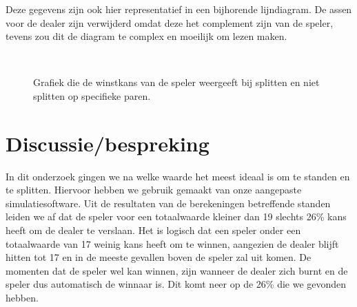 \documentclass[11pt, final, journal, a4paper]{IEEEtran}
\begin{document}
Deze gegevens zijn ook hier representatief in een bijhorende lijndiagram. De assen voor de dealer zijn verwijderd omdat deze het complement zijn van de speler, tevens zou dit de diagram te complex en moeilijk om lezen maken.

\begin{figure}[h]%
\begin{center}
\\
\caption{Grafiek die de winstkans van de speler weergeeft bij splitten en niet splitten op specifieke paren.}%
\end{center}
\end{figure}

\section{Discussie/bespreking}
In dit onderzoek gingen we na welke waarde het meest ideaal is om te standen en te splitten. Hiervoor hebben we gebruik gemaakt van onze aangepaste simulatiesoftware. Uit de resultaten van de berekeningen betreffende standen leiden we af dat de speler voor een totaalwaarde kleiner dan 19 slechts 26\% kans heeft om de dealer te verslaan. Het is logisch dat een speler onder een totaalwaarde van 17 weinig kans heeft om te winnen, aangezien de dealer blijft hitten tot 17 en in de meeste gevallen boven de speler zal uit komen. De momenten dat de speler wel kan winnen, zijn wanneer de dealer zich burnt en de speler dus automatisch de winnaar is. Dit komt neer op de 26\% die we gevonden hebben.
\end{document}
